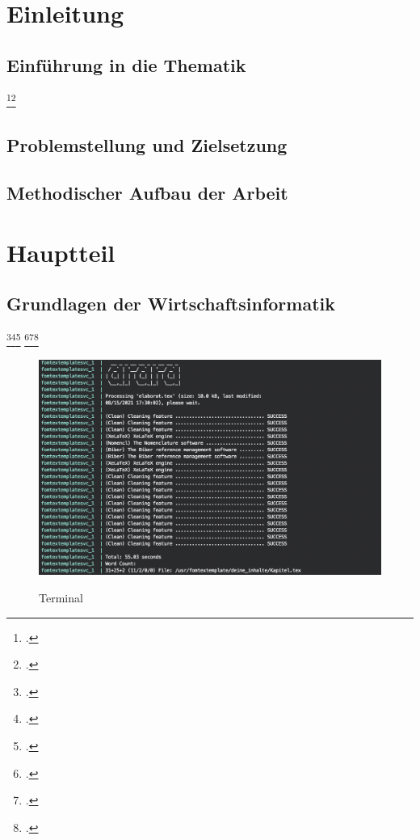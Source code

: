 \section{Einleitung}
\subsection{Einführung in die Thematik}
\blindtext{}
\blindtext\footcite[][]{mswpf}\footcite[][19]{sadtler_rechtskonformes_2017}

\subsection{Problemstellung und Zielsetzung}
\blindtext

\subsection{Methodischer Aufbau der Arbeit}
\blindtext

\section{Hauptteil}
\subsection{Grundlagen der Wirtschaftsinformatik}
\blindtext\footcite[][]{msdatabind}\footcite[][]{Atypisch}\footcite[][34]{Digitaloekonomie}
\blindenumerate
\blindtext\footcite[][415-426]{Tanenbaum2016}\footcite[][223]{mandl_internet_2019}\footcite[][123-124]{mertens_digitalisierung_2017}

\begin{figure}[!htb]
    \caption{Terminal}
    \includegraphics[width=1\textwidth]{.github/terminal}
    \captionsetup{width=1\textwidth}
    \label{abb_bsp}
\end{figure}
\blindtext

